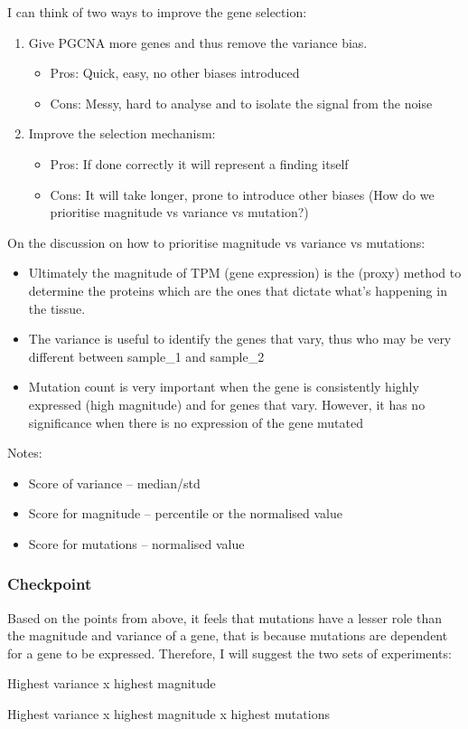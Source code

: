 I can think of two ways to improve the gene selection:
\begin{enumerate}
    \item Give PGCNA more genes and thus remove the variance bias.
          \begin{itemize}
              \item Pros: Quick, easy, no other biases introduced
              \item Cons: Messy, hard to analyse and to isolate the signal from the noise
          \end{itemize}
    \item Improve the selection mechanism:
          \begin{itemize}
              \item Pros: If done correctly it will represent a finding itself
              \item Cons: It will take longer, prone to introduce other biases (How do we prioritise magnitude vs variance vs mutation?)
          \end{itemize}
\end{enumerate}

On the discussion on how to prioritise magnitude vs variance vs mutations:
\begin{itemize}
    \item Ultimately the magnitude of TPM (gene expression) is the (proxy) method to determine the proteins which are the ones that dictate what's happening in the tissue.
    \item The variance is useful to identify the genes that vary, thus who may be very different between sample\_1 and sample\_2
    \item Mutation count is very important when the gene is consistently highly expressed (high magnitude) and for genes that vary. However, it has no significance when there is no expression of the gene mutated
\end{itemize}


Notes:
\begin{itemize}
    \item Score of variance – median/std
    \item Score for magnitude – percentile or the normalised value
    \item Score for mutations – normalised value
\end{itemize}


\subsubsection{Checkpoint}
Based on the points from above, it feels that mutations have a lesser role than the magnitude and variance of a gene, that is because mutations are dependent for a gene to be expressed. Therefore, I will suggest the two sets of experiments:
\begin{todolist}
    \item Highest variance x highest magnitude
    \item Highest variance x highest magnitude x highest mutations
\end{todolist}


